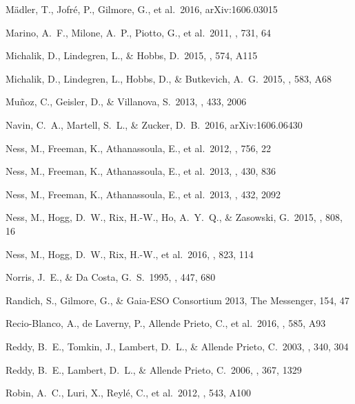 \documentclass[preprint,trackchanges]{aastex}
\begin{document}
\begin{thebibliography}{dummy}
 M{\"a}dler, T., Jofr{\'e}, P., Gilmore, G., et al.\ 2016, arXiv:1606.03015 

 Marino, A.~F., Milone, A.~P., Piotto, G., et al.\ 2011, \apj, 731, 64 

 Michalik, D., Lindegren, L., \& Hobbs, D.\ 2015, \aap, 574, A115 

 Michalik, D., Lindegren, L., Hobbs, D., \& Butkevich, A.~G.\ 2015, \aap, 583, A68 

 Mu{\~n}oz, C., Geisler, D., \& Villanova, S.\ 2013, \mnras, 433, 2006 

 Navin, C.~A., Martell, S.~L., \& Zucker, D.~B.\ 2016, arXiv:1606.06430 

 Ness, M., Freeman, K., Athanassoula, E., et al.\ 2012, \apj, 756, 22 

 Ness, M., Freeman, K., Athanassoula, E., et al.\ 2013, \mnras, 430, 836 

 Ness, M., Freeman, K., Athanassoula, E., et al.\ 2013, \mnras, 432, 2092 

 Ness, M., Hogg, D.~W., Rix, H.-W., Ho, A.~Y.~Q., \& Zasowski, G.\ 2015, \apj, 808, 16 

 Ness, M., Hogg, D.~W., Rix, H.-W., et al.\ 2016, \apj, 823, 114 

 Norris, J.~E., \& Da Costa, G.~S.\ 1995, \apj, 447, 680 

 Randich, S., Gilmore, G., \& Gaia-ESO Consortium 2013, The Messenger, 154, 47 

 Recio-Blanco, A., de Laverny, P., Allende Prieto, C., et al.\ 2016, \aap, 585, A93 

 Reddy, B.~E., Tomkin, J., Lambert, D.~L., \& Allende Prieto, C.\ 2003, \mnras, 340, 304 

 Reddy, B.~E., Lambert, D.~L., \& Allende Prieto, C.\ 2006, \mnras, 367, 1329 

 Robin, A.~C., Luri, X., Reyl{\'e}, C., et al.\ 2012, \aap, 543, A100 


\end{thebibliography}
\end{document}
